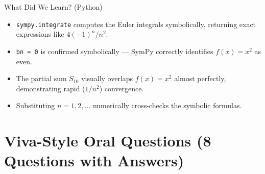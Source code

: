 \documentclass[12pt,a4paper]{article}
\begin{document}
\begin{learnbox}{What Did We Learn? (Python)}
\begin{itemize}
  \item \texttt{sympy.integrate} computes the Euler integrals symbolically, returning exact expressions like $4(-1)^n / n^2$.
  \item \texttt{bn = 0} is confirmed symbolically --- SymPy correctly identifies $f(x) = x^2$ as even.
  \item The partial sum $S_{10}$ visually overlaps $f(x) = x^2$ almost perfectly, demonstrating rapid ($1/n^2$) convergence.
  \item Substituting $n = 1, 2, \ldots$ numerically cross-checks the symbolic formulas.
\end{itemize}
\end{learnbox}

\section{Viva-Style Oral Questions (8 Questions with Answers)}
\end{document}

